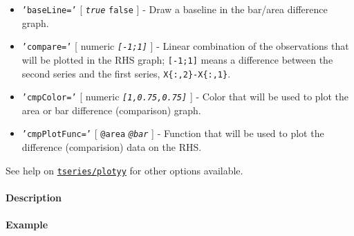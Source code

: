 \begin{itemize}
\item
  \texttt{'baseLine='} {[} \emph{\texttt{true}} \textbar{}
  \texttt{false} {]} - Draw a baseline in the bar/area difference graph.
\item
  \texttt{'compare='} {[} numeric \textbar{} \emph{\texttt{{[}-1;1{]}}}
  {]} - Linear combination of the observations that will be plotted in
  the RHS graph; \texttt{{[}-1;1{]}} means a difference between the
  second series and the first series, \texttt{X\{:,2\}-X\{:,1\}}.
\item
  \texttt{'cmpColor='} {[} numeric \textbar{}
  \emph{\texttt{{[}1,0.75,0.75{]}}} {]} - Color that will be used to
  plot the area or bar difference (comparison) graph.
\item
  \texttt{'cmpPlotFunc='} {[} \texttt{@area} \textbar{}
  \emph{\texttt{@bar}} {]} - Function that will be used to plot the
  difference (comparision) data on the RHS.
\end{itemize}

See help on \href{tseries/plotyy}{\texttt{tseries/plotyy}} for other
options available.

\paragraph{Description}\label{description}

\paragraph{Example}\label{example}


